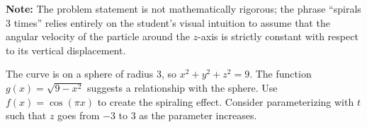 \begin{problem}
\vspace{0.5em}
\noindent
\textbf{Note:} The problem statement is not mathematically rigorous; the phrase ``spirals 3 times'' relies entirely on the student's visual intuition to assume that the angular velocity of the particle around the $z$-axis is strictly constant with respect to its vertical displacement.
\end{problem}

\begin{hint}
The curve is on a sphere of radius 3, so $x^2 + y^2 + z^2 = 9$. The function $g(x) = \sqrt{9-x^2}$ suggests a relationship with the sphere. Use $f(x) = \cos(\pi x)$ to create the spiraling effect. Consider parameterizing with $t$ such that $z$ goes from $-3$ to $3$ as the parameter increases.
\end{hint}

